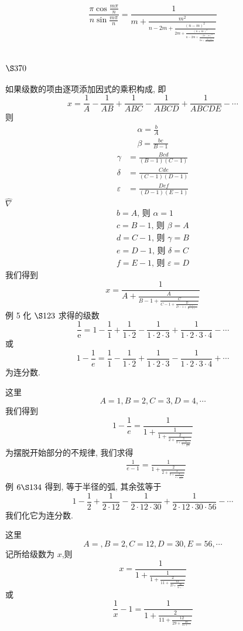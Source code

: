 \[\frac{\pi \cos \frac{m\pi}{n}}{n \sin \frac{m\pi}{n}}=\frac{1}{m+\frac{m^2}{n-2m+\frac{(n-m)^2}{2m+\frac{(n+m)^2}{n-2m+\frac{(2n-m)^2}{2m+\frac{(2n+m)^2}{n-2m+...}}}}}} \]

\section{$\S 370$}

如果级数的项由逐项添加因式的乘积构成, 即
\[
x=\frac{1}{A}-\frac{1}{A B}+\frac{1}{A B C}-\frac{1}{A B C D}+\frac{1}{A B C D E}-\cdots
\]
则
\[
\begin{gathered}
\alpha=\frac{b}{A} \\
\beta=\frac{b c}{B-1}
\end{gathered}
\]
\[
\begin{aligned}
\gamma & =\frac{B c d}{(B-1)(C-1)} \\
\delta & =\frac{C d e}{(C-1)(D-1)} \\
\varepsilon & =\frac{D e f}{(D-1)(E-1)}
\end{aligned}
\]
$\hat{\nabla}$
\[
\begin{gathered}
b=A \text {, 则 } \alpha=1 \\
c=B-1 \text {, 则 } \beta=A \\
d=C-1 \text {, 则 } \gamma=B \\
e=D-1 \text {, 则 } \delta=C \\
f=E-1 \text {, 则 } \varepsilon=D
\end{gathered}
\]
我们得到
\[
x=\frac{1}{A+\frac{A}{B-1+\frac{C}{C-1+\frac{D}{D-1+\frac{1+\cdots}{E-1+\cdots}}}}}
\]
例 5 化 $\S 123$ 求得的级数
\[
\frac{1}{\mathrm{e}}=1-\frac{1}{1}+\frac{1}{1 \cdot 2}-\frac{1}{1 \cdot 2 \cdot 3}+\frac{1}{1 \cdot 2 \cdot 3 \cdot 4}-\cdots
\]
或
\[
1-\frac{1}{e}=\frac{1}{1}-\frac{1}{1 \cdot 2}+\frac{1}{1 \cdot 2 \cdot 3}-\frac{1}{1 \cdot 2 \cdot 3 \cdot 4}+\cdots
\]
为连分数.

这里
\[
A=1, B=2, C=3, D=4, \cdots
\]
我们得到
\[
1-\frac{1}{e}=\frac{1}{1+\frac{1}{1+\frac{2}{2+\frac{3}{3+\frac{4}{4+\frac{5}{5+\cdots}}}}}}
\]
为摆脱开始部分的不规律, 我们求得 
\[
\begin{aligned}
& \frac{1}{e-1}=\frac{1}{1+\frac{2}{2+\frac{3}{3+\frac{4}{4+\frac{5}{5+\cdots}}}}}
\end{aligned}
\]
例 $6 \S 134$ 得到, 等于半径的弧, 其余弦等于
\[
1-\frac{1}{2}+\frac{1}{2 \cdot 12}-\frac{1}{2 \cdot 12 \cdot 30}+\frac{1}{2 \cdot 12 \cdot 30 \cdot 56}-\cdots
\]
我们化它为连分数.

这里
\[
A=, B=2, C=12, D=30, E=56, \cdots
\]
记所给级数为 $x$,则
\[
x=\frac{1}{1+\frac{1}{1+\frac{2}{11+\frac{12}{29+\frac{30}{55+\cdots}}}}}
\]
或
\[
\frac{1}{x}-1=\frac{1}{1+\frac{2}{11+\frac{12}{29+\frac{30}{55+\cdots}}}}
\]
